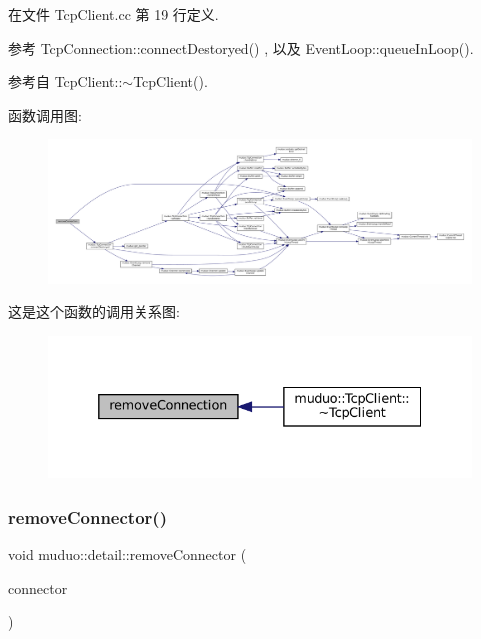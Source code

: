 在文件 Tcp\+Client.\+cc 第 19 行定义.



参考 Tcp\+Connection\+::connect\+Destoryed() , 以及 Event\+Loop\+::queue\+In\+Loop().



参考自 Tcp\+Client\+::$\sim$\+Tcp\+Client().

函数调用图\+:
\nopagebreak
\begin{figure}[H]
\begin{center}
\leavevmode
\includegraphics[width=350pt]{namespacemuduo_1_1detail_ae3e6bfc20f665df13eeb2ebc3c91abce_cgraph}
\end{center}
\end{figure}
这是这个函数的调用关系图\+:
\nopagebreak
\begin{figure}[H]
\begin{center}
\leavevmode
\includegraphics[width=332pt]{namespacemuduo_1_1detail_ae3e6bfc20f665df13eeb2ebc3c91abce_icgraph}
\end{center}
\end{figure}
\mbox{\label{namespacemuduo_1_1detail_ab9f5e26fda4b27382acd5a0740a83137}} 
\subsubsection{\texorpdfstring{remove\+Connector()}{removeConnector()}}
{\footnotesize\ttfamily void muduo\+::detail\+::remove\+Connector (\begin{DoxyParamCaption}\item[{const \hyperlink{namespacemuduo_a144f8adea97b4c9ac75c439f6d87ae29}{Connector\+Ptr} \&}]{connector }\end{DoxyParamCaption})}




